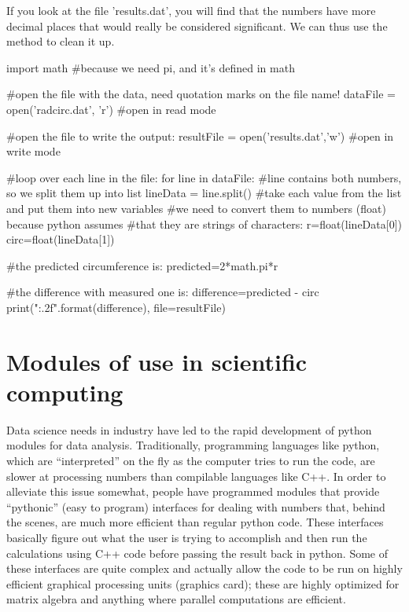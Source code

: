 If you look at the file 'results.dat', you will find that the numbers have more decimal places that would really be considered significant. We can thus use the  method to clean it up.

\begin{python}[caption = Reading and writing to a file with formatted data]
import math #because we need pi, and it's defined in math

#open the file with the data, need quotation marks on the file name!
dataFile = open('radcirc.dat', 'r') #open in read mode

#open the file to write the output:
resultFile = open('results.dat','w') #open in write mode

#loop over each line in the file:
for line in dataFile:
  #line contains both numbers, so we split them up into list
  lineData = line.split()
  #take each value from the list and put them into new variables
  #we need to convert them to numbers (float) because python assumes
  #that they are strings of characters:
  r=float(lineData[0])
  circ=float(lineData[1])
  
  #the predicted circumference is:
  predicted=2*math.pi*r
  
  #the difference with measured one is:
  difference=predicted - circ
  print("{:.2f}".format(difference), file=resultFile)

\end{python}


\section{Modules of use in scientific computing}

Data science needs in industry have led to the rapid development of python modules for data analysis. Traditionally, programming languages like python, which are ``interpreted'' on the fly as the computer tries to run the code, are slower at processing numbers than compilable languages like C++. In order to alleviate this issue somewhat, people have programmed modules that provide ``pythonic'' (easy to program) interfaces for dealing with numbers that, behind the scenes, are much more efficient than regular python code. These interfaces basically figure out what the user is trying to accomplish and then run the calculations using C++ code before passing the result back in python. Some of these interfaces are quite complex and actually allow the code to be run on highly efficient graphical processing units (graphics card); these are highly optimized for matrix algebra and anything where parallel computations are efficient.

